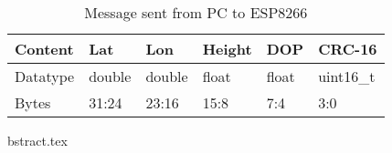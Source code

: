 \begin{table}[H]
\centering

\begin{tabularx}{0.75\textwidth}{@{}|X|X|X|X|X|X|@{}}
\toprule
Content & Lat    & Lon    & Height & DOP   & CRC-16  \\ \midrule
Datatype    & double & double & float  & float & uint16\_t \\ \midrule
Bytes    & 31:24  & 23:16   & 15:8    & 7:4 & 3:0 \\ \bottomrule
\end{tabularx}
\caption{Message sent from PC to ESP8266}
\label{my-label}
\end{table}
bstract.tex
